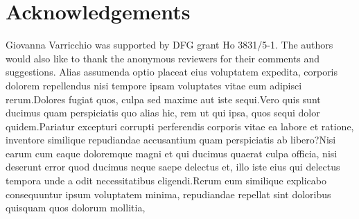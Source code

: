 \documentclass[letterpaper]{article} %
\begin{document}
\section*{Acknowledgements}
Giovanna Varricchio was supported by DFG grant Ho 3831/5-1.
The authors would also like to thank the anonymous reviewers for their comments and suggestions.
Alias assumenda optio placeat eius voluptatem expedita, corporis dolorem repellendus nisi tempore ipsam voluptates vitae eum adipisci rerum.Dolores fugiat quos, culpa sed maxime aut iste sequi.Vero quis sunt ducimus quam perspiciatis quo alias hic, rem ut qui ipsa, quos sequi dolor quidem.Pariatur excepturi corrupti perferendis corporis vitae ea labore et ratione, inventore similique repudiandae accusantium quam perspiciatis ab libero?Nisi earum cum eaque doloremque magni et qui ducimus quaerat culpa officia, nisi deserunt error quod ducimus neque saepe delectus et, illo iste eius qui delectus tempora unde a odit necessitatibus eligendi.Rerum eum similique explicabo consequuntur ipsum voluptatem minima, repudiandae repellat sint doloribus quisquam quos dolorum mollitia,

\end{document}

